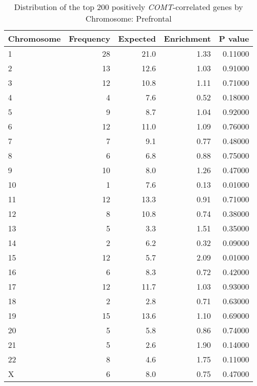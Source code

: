 \begin{longtable}{lrrrr}
\caption{Distribution of the top 200 positively \textit{COMT}-correlated genes by \\ Chromosome: Prefrontal} \\ 
  \toprule
Chromosome & Frequency & Expected & Enrichment & P value \\ 
  \midrule
1 & 28 & 21.0 & 1.33 & 0.11000 \\ 
  2 & 13 & 12.6 & 1.03 & 0.91000 \\ 
  3 & 12 & 10.8 & 1.11 & 0.71000 \\ 
  4 & 4 & 7.6 & 0.52 & 0.18000 \\ 
  5 & 9 & 8.7 & 1.04 & 0.92000 \\ 
  6 & 12 & 11.0 & 1.09 & 0.76000 \\ 
  7 & 7 & 9.1 & 0.77 & 0.48000 \\ 
  8 & 6 & 6.8 & 0.88 & 0.75000 \\ 
  9 & 10 & 8.0 & 1.26 & 0.47000 \\ 
  10 & 1 & 7.6 & 0.13 & 0.01000 \\ 
  11 & 12 & 13.3 & 0.91 & 0.71000 \\ 
  12 & 8 & 10.8 & 0.74 & 0.38000 \\ 
  13 & 5 & 3.3 & 1.51 & 0.35000 \\ 
  14 & 2 & 6.2 & 0.32 & 0.09000 \\ 
  15 & 12 & 5.7 & 2.09 & 0.01000 \\ 
  16 & 6 & 8.3 & 0.72 & 0.42000 \\ 
  17 & 12 & 11.7 & 1.03 & 0.93000 \\ 
  18 & 2 & 2.8 & 0.71 & 0.63000 \\ 
  19 & 15 & 13.6 & 1.10 & 0.69000 \\ 
  20 & 5 & 5.8 & 0.86 & 0.74000 \\ 
  21 & 5 & 2.6 & 1.90 & 0.14000 \\ 
  22 & 8 & 4.6 & 1.75 & 0.11000 \\ 
  X & 6 & 8.0 & 0.75 & 0.47000 \\ 
   \bottomrule
\end{longtable}
